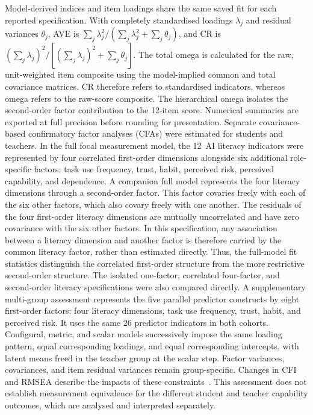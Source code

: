 \documentclass[sustainability,article,accept,moreauthors]{Definitions/mdpi}
\begin{document}
Model-derived indices and item loadings share the same saved fit for each reported specification. With completely standardised loadings $\lambda_j$ and residual variances $\theta_j$, AVE is $\sum_j\lambda_j^2/(\sum_j\lambda_j^2+\sum_j\theta_j)$, and CR is $(\sum_j\lambda_j)^2/[(\sum_j\lambda_j)^2+\sum_j\theta_j]$. The total omega is calculated for the raw, unit-weighted item composite using the model-implied common and total covariance matrices. CR therefore refers to standardised indicators, whereas omega refers to the raw-score composite. The hierarchical omega isolates the second-order factor contribution to the 12-item score. Numerical summaries are exported at full precision before rounding for presentation. Separate covariance-based confirmatory factor analyses (CFAs) were estimated for students and teachers. In the full focal measurement model, the 12~AI literacy indicators were represented by four correlated first-order dimensions alongside six additional role-specific factors: task use frequency, trust, habit, perceived risk, perceived capability, and dependence. A companion full model represents the four literacy dimensions through a second-order factor. This factor covaries freely with each of the six other factors, which also covary freely with one another. The residuals of the four first-order literacy dimensions are mutually uncorrelated and have zero covariance with the six other factors. In this specification, any association between a literacy dimension and another factor is therefore carried by the common literacy factor, rather than estimated directly. Thus, the full-model fit statistics distinguish the correlated first-order structure from the more restrictive second-order structure. The isolated one-factor, correlated four-factor, and second-order literacy specifications were also compared directly. A supplementary multi-group assessment represents the five parallel predictor constructs by eight first-order factors: four literacy dimensions, task use frequency, trust, habit, and perceived risk. It uses the same 26 predictor indicators in both cohorts. Configural, metric, and scalar models successively impose the same loading pattern, equal corresponding loadings, and equal corresponding intercepts, with latent means freed in the teacher group at the scalar step. Factor variances, covariances, and item residual variances remain group-specific. Changes in CFI and RMSEA describe the impacts of these constraints~\cite{putnick2016}. This assessment does not establish measurement equivalence for the different student and teacher capability outcomes, which are analysed and interpreted separately.
\end{document}

